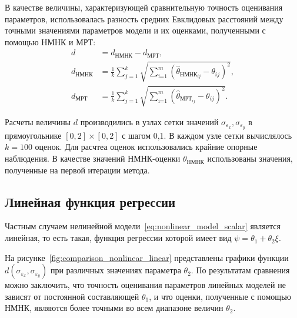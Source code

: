 В качестве величины, характеризующей сравнительную точность оценивания параметров,
использовалась разность средних Евклидовых расстояний
между точными значениями параметров модели и их оценками, полученными
с помощью НМНК и МРТ:
\begin{equation}
  \begin{aligned}
    d &= d_{\text{НМНК}} - d_{\text{МРТ}}, \\
    d_{\text{НМНК}} &=
    \frac{1}{k} \sum_{j=1}^k
    \sqrt{\sum_{\text{i=1}}^m (\hat{\theta}_{\text{НМНК}_{ij}} - \theta_{ij})^2}, \\
    d_{\text{МРТ}} &=
    \frac{1}{k} \sum_{j=1}^k
    \sqrt{\sum_{\text{i=1}}^m (\hat{\theta}_{\text{МРТ}_{ij}} - \theta_{ij})^2}.
  \end{aligned}
  \label{eq:dst_nonlinear_param}
\end{equation}

Расчеты величины \( d \) производились в узлах сетки значений
\( \sigma_{\varepsilon_x}, \sigma_{\varepsilon_y} \) в прямоугольнике
\( [0, 2] \times [0, 2] \) с шагом 0{,}1.
В каждом узле сетки вычислялось \( k = 100 \) оценок.
Для расчтеа оценок использовались крайние опорные наблюдения.
В качестве значений НМНК-оценки \( \theta_{\text{НМНК}} \)
использованы значения, полученные на первой итерации метода.

\vspace{2\baselineskip}
\subsection{Линейная функция регрессии}

Частным случаем нелинейной модели~\eqref{eq:nonlinear_model_scalar} является линейная,
то есть такая, функция регрессии которой имеет вид \( \psi = \theta_1 + \theta_2 \xi \).

На рисунке~\ref{fig:comparison_nonlinear_linear}
представлены графики функции \( d(\sigma_{\varepsilon_x}, \sigma_{\varepsilon_y}) \)
при различных значениях параметра \( \theta_2 \).
По результатам сравнения можно заключить, что точность оценивания параметров линейных моделей
не зависят от постоянной составляющей \( \theta_1 \), и что оценки, полученные с помощью НМНК,
являются более точными во всем диапазоне величин \( \theta_2 \).

